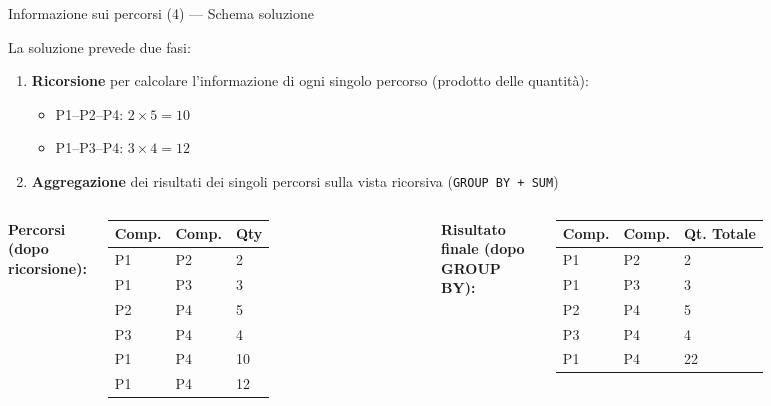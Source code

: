 \documentclass[aspectratio=169]{beamer}
\begin{document}
\begin{frame}{Informazione sui percorsi (4) — Schema soluzione}

La soluzione prevede due fasi:

\begin{enumerate}
  \item \textbf{Ricorsione} per calcolare l'informazione di ogni singolo percorso (prodotto delle quantità):
    \begin{itemize}
      \item P1--P2--P4: $2 \times 5 = 10$
      \item P1--P3--P4: $3 \times 4 = 12$
    \end{itemize}
  \item \textbf{Aggregazione} dei risultati dei singoli percorsi sulla vista ricorsiva (\texttt{GROUP BY + SUM})
\end{enumerate}

\vspace{8pt}
\begin{columns}[T]
\textbf{Percorsi (dopo ricorsione):}\\[4pt]
\small
\begin{tabular}{|l|l|l|}
\hline
\textbf{Comp.} & \textbf{Comp.} & \textbf{Qty}\\
\hline
P1 & P2 & 2 \\
P1 & P3 & 3 \\
P2 & P4 & 5 \\
P3 & P4 & 4 \\
P1 & P4 & 10 \\
P1 & P4 & 12 \\
\hline
\end{tabular}
\textbf{Risultato finale (dopo GROUP BY):}\\[4pt]
\small
\begin{tabular}{|l|l|l|}
\hline
\textbf{Comp.} & \textbf{Comp.} & \textbf{Qt. Totale}\\
\hline
P1 & P2 & 2  \\
P1 & P3 & 3  \\
P2 & P4 & 5  \\
P3 & P4 & 4  \\
P1 & P4 & 22 \\
\hline
\end{tabular}
\end{columns}

\end{frame}
\end{document}

